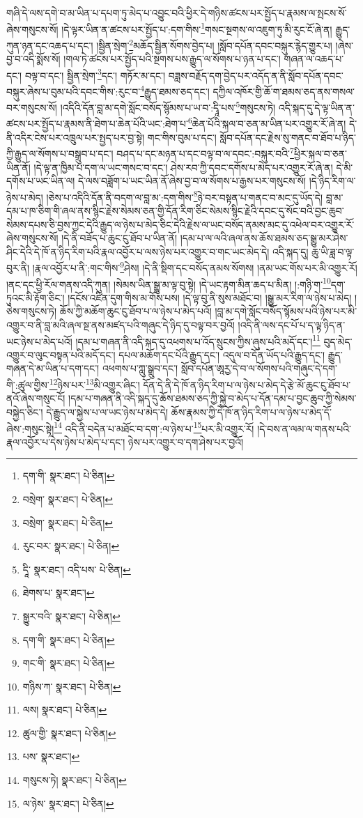 གཞི་དེ་ལས་དགེ་བ་མ་ཡིན་པ་དཔག་ཏུ་མེད་པ་འབྱུང་བའི་ཕྱིར་དེ་གཉིས་ཚངས་པར་སྤྱོད་པ་རྣམས་ལ་སྤངས་སོ་ཞེས་གསུངས་སོ། །དེ་ལྟར་ཡིན་ན་ཚངས་པར་སྤྱོད་པ་:དག་གིས་\footnote{དག་གི་  སྣར་ཐང་།  པེ་ཅིན། }གསང་སྔགས་ལ་འཇུག་ཏུ་མི་རུང་ངོ་ཞེ་ན། རྒྱུད་ཀུན་ཉན་དང་འཆད་པ་དང་། །སྦྱིན་སྲེག་\footnote{བསྲེག་  སྣར་ཐང་།  པེ་ཅིན། }མཆོད་སྦྱིན་སོགས་བྱེད་པ། །སློབ་དཔོན་དབང་བསྐུར་རྙེད་གྱུར་པ། །ཞེས་བྱ་བ་འདི་སྨོས་སོ། །གལ་ཏེ་ཚངས་པར་སྤྱོད་པའི་སྔགས་པས་རྒྱུད་ལ་སོགས་པ་ཉན་པ་དང་། གཞན་ལ་འཆད་པ་དང་། བལྟ་བ་དང་། སྦྱིན་སྲེག་\footnote{བསྲེག་  སྣར་ཐང་།  པེ་ཅིན། }དང་། གཏོར་མ་དང་། བཟླས་བརྗོད་དག་བྱེད་པར་འདོད་ན་ནི་སློབ་དཔོན་དབང་བསྐུར་ཞེས་པ་བུམ་པའི་དབང་གིས་:རུང་བ་\footnote{རུང་བར་  སྣར་ཐང་།  པེ་ཅིན། }རྒྱུད་ཐམས་ཅད་དང་། དཀྱིལ་འཁོར་གྱི་ཆོ་ག་ཐམས་ཅད་ནས་གསལ་བར་གསུངས་སོ། །འདིའི་དོན་བླ་མ་དགེ་སློང་བསོད་སྙོམས་པ་ཡ་བ་:དྭཱི་པས་\footnote{དཱི་  སྣར་ཐང་། འདི་པས་  པེ་ཅིན། }གསུངས་ཏེ། འདི་སྐད་དུ་དེ་ལྟ་ཡིན་ན་ཚངས་པར་སྤྱོད་པ་རྣམས་ནི་ཐེག་པ་ཆེན་པོའི་ཡང་:ཐེག་པ་\footnote{ཐེགས་པ་  སྣར་ཐང་། }ཆེན་པོའི་སྐལ་བ་ཅན་མ་ཡིན་པར་འགྱུར་རོ་ཞེ་ན། དེ་ནི་འདིར་ངེས་པར་འཁྲུལ་པར་སྤྱད་པར་བྱ་སྟེ། གང་གིས་བུམ་པ་དང་། སློབ་དཔོན་དང་རྗེས་སུ་གནང་བ་ཐོབ་པ་ཉིད་ཀྱི་རྒྱུད་ལ་སོགས་པ་བསྒྲུབ་པ་དང་། བཤད་པ་དང་མཉན་པ་དང་བལྟ་བ་ལ་དབང་:བསྐུར་བའི་\footnote{སྒྱུར་བའི་  སྣར་ཐང་།  པེ་ཅིན། }ཕྱིར་སྐལ་བ་ཅན་ཡིན་ནོ། །དེ་ལྟ་ན་ཁྱིམ་པ་དག་ལ་ཡང་གསང་བ་དང་། ཤེས་རབ་ཀྱི་དབང་དགོས་པ་མེད་པར་འགྱུར་རོ་ཞེ་ན། དེ་མི་དགོས་པ་ཡང་ཡིན་ལ། དེ་ལས་བཟློག་པ་ཡང་ཡིན་ནོ་ཞེས་བྱ་བ་ལ་སོགས་པ་རྒྱས་པར་གསུངས་སོ། །དེ་ཉིད་རིག་ལ་ཉེས་པ་མེད། །ཅེས་པ་འདིའི་དོན་ནི་བདག་ལ་བླ་མ་:དག་གིས་\footnote{དག་གི་  སྣར་ཐང་།  པེ་ཅིན། }ཉེ་བར་བསྟན་པ་གནང་བ་མང་དུ་ཡོད་དེ། བླ་མ་དམ་པ་ཁ་ཅིག་གི་ཞལ་ནས་སྙིང་རྗེས་སེམས་ཅན་གྱི་དོན་རིག་ཅིང་སེམས་སྙིང་རྗེའི་དབང་དུ་སོང་བའི་བྱང་ཆུབ་སེམས་དཔས་ཅི་བྱས་ཀྱང་དེའི་རྒྱུད་ལ་ཉེས་པ་མེད་ཅིང་དེའི་རྗེས་ལ་ཡང་བསོད་ནམས་མང་དུ་འཕེལ་བར་འགྱུར་རོ་ཞེས་གསུངས་སོ། །དེ་ནི་བཟོད་པ་ཆུང་ངུ་ཐོབ་པ་ཡིན་ནོ། །དམ་པ་ལ་ལའི་ཞལ་ནས་ཆོས་ཐམས་ཅད་སྒྱུ་མར་ཤེས་ཤིང་དེའི་དེ་ཁོ་ན་ཉིད་རིག་པའི་རྣལ་འབྱོར་པ་ལས་ཉེས་པར་འགྱུར་བ་གང་ཡང་མེད་དེ། འདི་སྐད་དུ། ཆུ་ཡི་ཟླ་བ་ལྟ་བུར་ནི། །རྣལ་འབྱོར་པ་ནི་:གང་གིས་\footnote{གང་གི་  སྣར་ཐང་།  པེ་ཅིན། }ཤེས། །དེ་ནི་སྡིག་དང་བསོད་ནམས་སོགས། །ནམ་ཡང་གོས་པར་མི་འགྱུར་རོ། །ནང་དང་ཕྱི་རོལ་གནས་འདི་ཀུན། །སེམས་ཡིན་སྒྱུ་མ་ལྟ་བུ་སྟེ། །དེ་ཡང་རྟག་མིན་ཆད་པ་མིན། །:གཉི་ག་\footnote{གཉིས་ཀ་  སྣར་ཐང་།  པེ་ཅིན། }དག་ཏུའང་མི་རྟོག་ཅིང་། །དངོས་འཛིན་དུག་གིས་མ་གོས་པས། །དེ་ལྟ་བུ་ནི་སུས་མཐོང་བ། །སྒྱུ་མར་རིག་ལ་ཉེས་པ་མེད། །ཅེས་གསུངས་ཏེ། ཆོས་ཀྱི་མཆོག་ཆུང་ངུ་ཐོབ་པ་ལ་ཉེས་པ་མེད་པའོ། །བླ་མ་དགེ་སློང་བསོད་སྙོམས་པའི་ཉེས་པར་མི་འགྱུར་བ་ནི་བླ་མའི་ཞལ་སྔ་ནས་མཛད་པའི་གཞུང་དེ་ཉིད་དུ་བལྟ་བར་བྱའོ། །འདི་ནི་ལས་དང་པོ་པ་ད་ལྟ་ཉིད་ན་ཡང་ཉེས་པ་མེད་པའོ། །དམ་པ་གཞན་ནི་འདི་སྐད་དུ་འཕགས་པ་འོད་སྲུངས་ཀྱིས་ཞུས་པའི་མདོ་དང་།\footnote{ལས།  སྣར་ཐང་།  པེ་ཅིན། } བུད་མེད་འགྱུར་བ་ལུང་བསྟན་པའི་མདོ་དང་། དཔལ་མཆོག་དང་པོའི་རྒྱུད་དང་། འདུལ་བ་དོན་ཡོད་པའི་རྒྱུད་དང་། རྒྱུད་གཞན་དེ་མ་ཡིན་པ་དག་དང་། འཕགས་པ་ཀླུ་སྒྲུབ་དང་། སློབ་དཔོན་ཨཱརྱ་དེ་བ་ལ་སོགས་པའི་གཞུང་དེ་དག་གི་:ཚུལ་གྱིས་\footnote{ཚུལ་གྱི་  སྣར་ཐང་།  པེ་ཅིན། }ཉེས་པར་\footnote{པས་  སྣར་ཐང་། }མི་འགྱུར་ཞིང་། དོན་དེ་ནི་དེ་ཁོ་ན་ཉིད་རིག་པ་ལ་ཉེས་པ་མེད་དེ་རྩེ་མོ་ཆུང་ངུ་ཐོབ་པ་ནའོ་ཞེས་གསུང་ངོ། །དམ་པ་གཞན་ནི་འདི་སྐད་དུ་ཆོས་ཐམས་ཅད་ཀྱི་སྐྱེ་བ་མེད་པ་དོན་དམ་པ་བྱང་ཆུབ་ཀྱི་སེམས་བསྐྱེད་ཅིང་། དེ་རྒྱུད་ལ་སྐྱེས་པ་ལ་ཡང་ཉེས་པ་མེད་དེ། ཆོས་རྣམས་ཀྱི་དེ་ཁོ་ན་ཉིད་རིག་པ་ལ་ཉེས་པ་མེད་དོ་ཞེས་:གསུང་སྟེ།\footnote{གསུངས་ཏེ།  སྣར་ཐང་།  པེ་ཅིན། } འདི་ནི་བདེན་པ་མཐོང་བ་དག་:ལ་ཉེས་པ་\footnote{ལ་ཉེས་  སྣར་ཐང་།  པེ་ཅིན། }པར་མི་འགྱུར་རོ། །དེ་བས་ན་ལམ་ལ་གནས་པའི་རྣལ་འབྱོར་པ་དེས་ཉེས་པ་མེད་པ་དང་། ཉེས་པར་འགྱུར་བ་དག་ཤེས་པར་བྱའོ། 